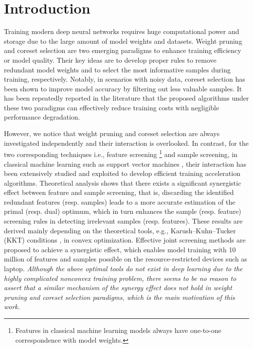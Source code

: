 \section{Introduction}
\label{sec:intro}
Training modern deep neural networks requires huge computational power and storage due to the large amount of model weights and datasets.
Weight pruning and coreset selection \citep{hoefler2021sparsity,killamsetty2021grad} are two emerging paradigms to enhance training efficiency or model quality. Their key ideas are to develop proper rules to remove redundant model weights and to select the most informative samples during training, respectively. 
Notably, in scenarios with noisy data, coreset selection has been shown to improve model accuracy by filtering out less valuable samples.
It has been repeatedly reported in the literature \citep{hoefler2021sparsity,mirzasoleiman2020coresets,killamsetty2021grad} that the proposed algorithms under these two paradigms can effectively reduce training costs with negligible performance degradation. 

However, we notice that weight pruning and coreset selection are always investigated independently and their interaction is overlooked. In contrast, for the two corresponding techniques i.e., feature screening \footnote{Features in classical machine learning models always have one-to-one correspondence  with model weights.} and sample screening, in classical machine learning such as support vector machines \cite{shibagaki2016simultaneous,zhang2017scaling}, their interaction has been extensively studied and exploited to develop efficient training acceleration algorithms. Theoretical analysis shows that there exists a significant synergistic effect between feature and sample screening, that is, discarding the identified redundant features (resp. samples)  leads to a more accurate estimation of the primal (resp. dual) optimum, which in turn enhances the sample (resp. feature) screening rules in detecting irrelevant samples (resp. features). These results are derived mainly depending on the theoretical tools, e.g., Karush–Kuhn–Tucker (KKT) conditions \cite{kuhn2013nonlinear}, in convex optimization. Effective joint screening methods are proposed to achieve a synergistic effect, which enables model training with 10 million of features and samples possible on the resource-restricted devices such as laptop.  {\it Although the above optimal tools do not exist in deep learning due to the highly complicated nonconvex training problem, there seems to be no reason to assert that a similar mechanism of the synergy effect does not hold in weight pruning and coreset selection paradigms, which is the main motivation of this work. }

